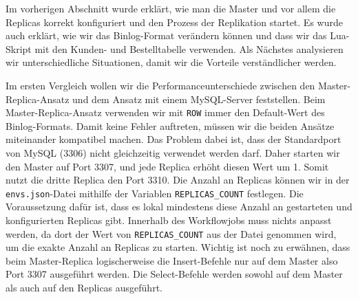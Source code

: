 Im vorherigen Abschnitt wurde erklärt, wie man die Master und vor allem die Replicas korrekt konfiguriert und den Prozess der Replikation startet.
Es wurde auch erklärt, wie wir das Binlog-Format verändern können und dass wir das Lua-Skript mit den Kunden- und Bestelltabelle verwenden.
Als Nächstes analysieren wir unterschiedliche Situationen, damit wir die Vorteile verständlicher werden.

Im ersten Vergleich wollen wir die Performanceunterschiede zwischen den Master-Replica-Ansatz und dem Ansatz mit einem MySQL-Server feststellen.
Beim Master-Replica-Ansatz verwenden wir mit \texttt{ROW} immer den Default-Wert des Binlog-Formats.
Damit keine Fehler auftreten, müssen wir die beiden Ansätze miteinander kompatibel machen.
Das Problem dabei ist, dass der Standardport von MySQL (3306) nicht gleichzeitig verwendet werden darf.
Daher starten wir den Master auf Port 3307, und jede Replica erhöht diesen Wert um 1.
Somit nutzt die dritte Replica den Port 3310.
Die Anzahl an Replicas können wir in der \texttt{envs.json}-Datei mithilfe der Variablen \texttt{REPLICAS\_COUNT} festlegen.
Die Voraussetzung dafür ist, dass es lokal mindestens diese Anzahl an gestarteten und konfigurierten Replicas gibt.
Innerhalb des Workflowjobs muss nichts anpasst werden, da dort der Wert von \texttt{REPLICAS\_COUNT} aus der Datei genommen wird, um die exakte Anzahl an Replicas zu starten.
Wichtig ist noch zu erwähnen, dass beim Master-Replica logischerweise die Insert-Befehle nur auf dem Master also Port 3307 ausgeführt werden.
Die Select-Befehle werden sowohl auf dem Master als auch auf den Replicas ausgeführt.

